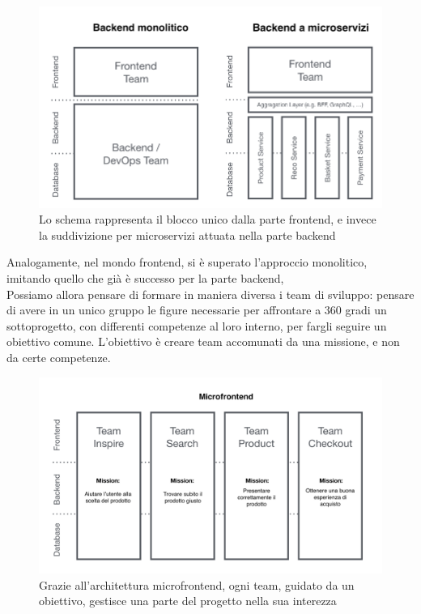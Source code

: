 \begin{figure}[H]
    \centering
    \includegraphics[width=140mm]{img/monolite}
    \caption{Lo schema rappresenta il blocco unico dalla parte frontend, e invece la suddivizione per 
    microservizi attuata nella parte backend}
  \end{figure}
Analogamente, nel mondo frontend, si è superato l'approccio monolitico, imitando quello che già è 
successo per la parte backend,
\\
Possiamo allora pensare di formare in maniera diversa i team di sviluppo: pensare di avere in un unico gruppo
le figure necessarie per affrontare a 360 gradi un sottoprogetto, con differenti competenze al
loro interno, per fargli seguire un obiettivo comune. L'obiettivo è creare team accomunati da una missione, e non da certe competenze.
\begin{figure}[H]
    \centering
    \includegraphics[width=140mm]{img/microfrontend}
    \caption{Grazie all'architettura microfrontend, ogni team, guidato da un obiettivo, gestisce una 
    parte del progetto nella sua interezza}
  \end{figure}
